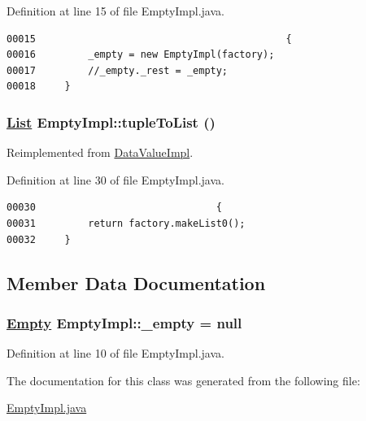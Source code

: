 Definition at line 15 of file Empty\-Impl.java.\footnotesize\begin{verbatim}00015                                           {
00016         _empty = new EmptyImpl(factory);
00017         //_empty._rest = _empty;
00018     }
\end{verbatim}\normalsize 
\hypertarget{classEmptyImpl_a1}{
\subsubsection[tupleToList]{\setlength{\rightskip}{0pt plus 5cm}\hyperlink{interfaceList}{List} Empty\-Impl::tuple\-To\-List ()}}
\label{classEmptyImpl_a1}




Reimplemented from \hyperlink{classDataValueImpl_a2}{Data\-Value\-Impl}.

Definition at line 30 of file Empty\-Impl.java.\footnotesize\begin{verbatim}00030                               {
00031         return factory.makeList0();
00032     }
\end{verbatim}\normalsize 


\subsection{Member Data Documentation}
\hypertarget{classEmptyImpl_r0}{
\subsubsection[\_\-empty]{\setlength{\rightskip}{0pt plus 5cm}\hyperlink{interfaceEmpty}{Empty} Empty\-Impl::\_\-empty = null}}
\label{classEmptyImpl_r0}




Definition at line 10 of file Empty\-Impl.java.

The documentation for this class was generated from the following file:\begin{CompactItemize}
\item 
\hyperlink{EmptyImpl_8java-source}{Empty\-Impl.java}\end{CompactItemize}
